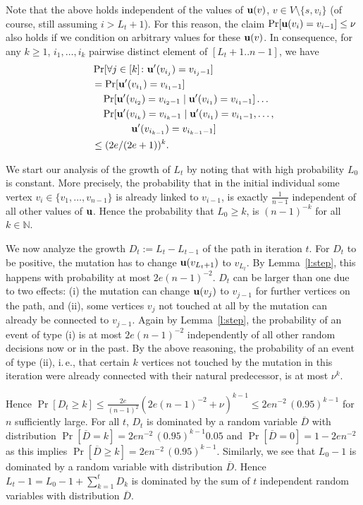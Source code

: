 \documentclass{sig-alternate}
\makeatletter
\newcommand{\ie}{i.\,e.\xspace}
\newcommand{\N}{{\mathbb{N}}}
\newcommand{\tref}[1]{Theorem~\ref{#1}}
\newcommand{\lref}[1]{Lemma~\ref{#1}}
\DeclareRobustCommand{\qed}{\ifmmode\mathqed\else\leavevmode\unskip\penalty9999\hbox{}\nobreak\hfill\quad\hbox{\qedsymbol}\fi}
\let\QED@stack\@empty
\let\qed@elt\relax
\newcommand{\pushQED}[1]{\toks@{\qed@elt{#1}}\@temptokena\expandafter{\QED@stack}\xdef\QED@stack{\the\toks@\the\@temptokena}}
\newcommand{\popQED}{\begingroup\let\qed@elt\popQED@elt \QED@stack\relax\relax\endgroup}
\def\popQED@elt#1#2\relax{#1\gdef\QED@stack{#2}}
\newcommand{\mathqed}{\quad\hbox{\qedsymbol}}
\newcommand{\openbox}{\leavevmode\hbox to.77778em{\hfil\vrule\vbox to.675em{\hrule width.6em\vfil\hrule}\vrule\hfil}}
\providecommand{\qedsymbol}{\openbox}
\renewenvironment{proof}[1][\proofname]{\par\pushQED{\qed}\normalfont\topsep6\p@\@plus6\p@\relax\trivlist\item[\hskip\labelsep\itshape #1\@addpunct{.}]\ignorespaces}{\popQED\endtrivlist\@endpefalse}
\providecommand{\proofname}{Proof}
\makeatother
\begin{document}
\begin{proof}[Proof of \tref{t:lowl}]
  Note that the above holds independent of the values of $\mathbf{u}(v)$, $v \in V 
  \setminus \{s, v_i\}$ (of course, still assuming $i > L_t +1$). For this 
  reason, the claim $\Pr[\mathbf{u}(v_i) = v_{i-1}] \le \nu$ also holds 
  if we condition on arbitrary values for these $\mathbf{u}(v)$. In consequence, for any 
  $k \ge 1$, $i_1, \ldots, i_k$ pairwise distinct element of $[L_t+1..n-1]$,  we have
  \begin{align*}
  &\Pr[\forall j \in [k]\colon \mathbf{u}'(v_{i_j}) = v_{i_j-1}]\\
  &= \Pr[\mathbf{u}'(v_{i_1}) = v_{i_1-1}]\\
  &\quad \Pr[\mathbf{u}'(v_{i_2}) = v_{i_2-1} \mid \mathbf{u}'(v_{i_1}) = v_{i_1-1}] \ldots \\
  &\quad \Pr[\mathbf{u}'(v_{i_k}) = v_{i_k-1} \mid \mathbf{u}'(v_{i_1}) = v_{i_1-1},  \ldots, \\
  &\qquad\qquad\mathbf{u}'(v_{i_{k-1}}) = v_{i_{k-1}-1}]\\
  &\le (2e/(2e+1))^k.
  \end{align*}
  
  We start our analysis of the growth of $L_t$ by noting that with high probability $L_0$ is constant.
  More precisely, the probability that in the initial individual some vertex $v_i \in \{v_1, 
  \ldots, v_{n-1}\}$ is already linked to $v_{i-1}$, is exactly $\frac{1}{n-1}$ independent of all other values of $\mathbf{u}$. 
  Hence the probability that $L_0 \ge k$, is $(n-1)^{-k}$ for all $k \in \N$.

  We now analyze the growth $D_t := L_t - L_{t-1}$ of the path in iteration $t$. 
  For $D_t$ to be positive, the mutation has to change $\mathbf{u}(v_{L_t+1})$ to 
  $v_{L_t}$. By \lref{l:step}, this happens with probability at most $2e(n-1)^{-2}$. 
  $D_t$ can be larger than one due to two effects: (i) the mutation can change 
  $\mathbf{u}(v_j)$ to $v_{j-1}$ for further vertices on the path, and (ii), some 
  vertices $v_j$ not touched at all by the mutation can already be connected to 
  $v_{j-1}$. Again by \lref{l:step}, the probability of an event of type (i) is at most 
  $2e(n-1)^{-2}$ independently of all other random decisions now or in the past. 
  By the above reasoning, the probability of an event of type (ii), \ie, that 
  certain $k$ vertices not touched by the mutation in this iteration were 
  already connected with their natural predecessor, is at most $\nu^k$. 
  
  Hence $\Pr[D_t \ge k] \le \frac{2e}{(n-1)^2} ( 2e(n-1)^{-2} + \nu )^{k-1}
                         \le  2en^{-2}\,(0.95)^{k-1}$                         
  for $n$ sufficiently large.
  For all $t$, $D_t$ is dominated by a random variable $\overline D$ with 
  distribution $\Pr[\overline D = k] = 2en^{-2}\,(0.95)^{k-1} 0.05$ and
  $\Pr[\overline D = 0] = 1 - 2en^{-2}$ as this implies
  $\Pr[\overline D \ge k] = 2en^{-2}\,(0.95)^{k-1}$. 
  Similarly, we see that $L_0-1$ is dominated by a random variable with 
  distribution $\overline D$. Hence $L_t -1 = L_0 -1 + \sum_{k = 1}^t D_k$ is 
  dominated by the sum of $t$ independent random variables with distribution $\overline D$.
  

\end{proof}
\end{document}
